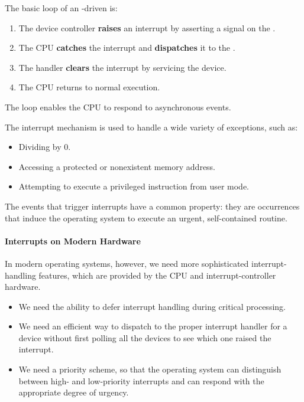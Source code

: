 The basic loop of an -driven  is:
\begin{enumerate}[noitemsep]
\item The device controller \textbf{raises} an interrupt by asserting a signal on the .
\item The CPU \textbf{catches} the interrupt and \textbf{dispatches} it to the .
\item The handler \textbf{clears} the interrupt by servicing the device.
\item The CPU returns to normal execution.
\end{enumerate}

The loop enables the CPU to respond to asynchronous events.

The interrupt mechanism is used to handle a wide variety of exceptions, such as:
\begin{itemize}[noitemsep]
\item Dividing by 0.
\item Accessing a protected or nonexistent memory address.
\item Attempting to execute a privileged instruction from user mode.
\end{itemize}

The events that trigger interrupts have a common property: they are occurrences that induce the operating system to execute an urgent, self-contained routine.

\paragraph{Interrupts on Modern Hardware}\label{par:Interrupts_Modern_Hardware}
In modern operating systems, however, we need more sophisticated interrupt-handling features, which are provided by the CPU and interrupt-controller hardware.
\begin{itemize}[noitemsep]
\item We need the ability to defer interrupt handling during critical processing.
\item We need an efficient way to dispatch to the proper interrupt handler for a device without first polling all the devices to see which one raised the interrupt.
\item We need a priority scheme, so that the operating system can distinguish between high- and low-priority interrupts and can respond with the appropriate degree of urgency.
\end{itemize}

